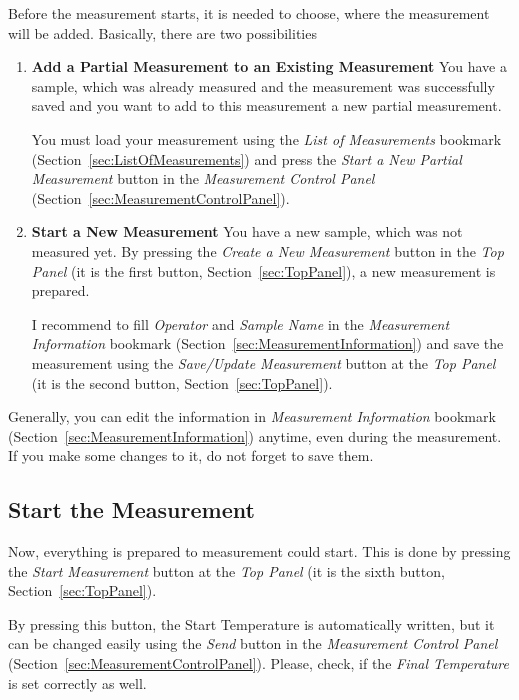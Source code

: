 \documentclass[a4paper,11pt,twoside]{book}
\theoremstyle{named}
\begin{document}
Before the measurement starts, it is needed to choose, where the measurement
will be added. Basically, there are two possibilities

\begin{enumerate}
  \item \textbf{Add a Partial Measurement to an Existing Measurement}
    You have a sample, which was already measured and the measurement was
    successfully saved and you want to add to this measurement a new partial
    measurement.

    You must load your measurement using the \textit{List of Measurements} bookmark
    (Section~\ref{sec:ListOfMeasurements}) and press the \textit{Start a New
    Partial Measurement} button in the \textit{Measurement Control Panel}
    (Section~\ref{sec:MeasurementControlPanel}).

  \item \textbf{Start a New Measurement}
    You have a new sample, which was not measured yet. By pressing the
    \textit{Create a New Measurement} button in the \textit{Top Panel}
    (it is the first button, Section~\ref{sec:TopPanel}), a new measurement is
    prepared.

    I recommend to fill \textit{Operator} and \textit{Sample Name} in the
    \textit{Measurement Information} bookmark
    (Section~\ref{sec:MeasurementInformation}) and save the measurement using
    the \textit{Save/Update Measurement} button at the \textit{Top Panel}
    (it is the second button, Section~\ref{sec:TopPanel}). 
\end{enumerate}

Generally, you can edit the information in \textit{Measurement Information}
bookmark (Section~\ref{sec:MeasurementInformation}) anytime, even during the
measurement. If you make some changes to it, do not forget to save them.

\subsection{Start the Measurement}

Now, everything is prepared to measurement could start. This is done by pressing
the \textit{Start Measurement} button at the \textit{Top Panel} (it is the
sixth button, Section~\ref{sec:TopPanel}).

By pressing this button, the Start Temperature is automatically written, but
it can be changed easily using the \textit{Send} button in the
\textit{Measurement Control Panel} (Section~\ref{sec:MeasurementControlPanel}).
Please, check, if the \textit{Final Temperature} is set correctly as well.
\end{document}
